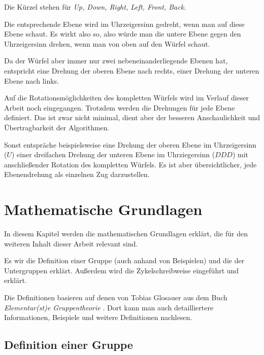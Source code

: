 \documentclass[12pt,a4paper, usenames, dvipsnames]{article}
\begin{document}
Die Kürzel stehen für \textit{Up, Down, Right, Left, Front, Back}.  


Die entsprechende Ebene wird im Uhrzeigersinn gedreht, wenn man auf diese Ebene schaut. Es wirkt also so, also würde man die untere Ebene gegen den Uhrzeigersinn drehen, wenn man von oben auf den Würfel schaut.  


Da der Würfel aber immer nur zwei nebeneinanderliegende Ebenen hat, entspricht eine Drehung der oberen Ebene nach rechts, einer Drehung der unteren Ebene nach links. 

Auf die Rotationsmöglichkeiten des kompletten Würfels wird im Verlauf dieser Arbeit noch eingegangen. Trotzdem werden die Drehungen für jede Ebene definiert. Das ist zwar nicht minimal, dient aber der besseren Anschaulichkeit und Übertragbarkeit der Algorithmen.

Sonst entspräche beispielsweise eine Drehung der oberen Ebene im Uhrzeigersinn ($U$) einer dreifachen Drehung der unteren Ebene im Uhrziegersinn ($DDD$) mit anschließender Rotation des kompletten Würfels. Es ist aber übersichtlicher, jede Ebenendrehung als einzelnen Zug darzustellen.


%
%
%
%
%
%
%
%
%
%
%
%
%
%
%
%
%


\newpage
\section{Mathematische Grundlagen}

In diesem Kapitel werden die mathematischen Grundlagen erklärt, die für den weiteren Inhalt dieser Arbeit relevant sind.

Es wir die Definition einer Gruppe (auch anhand von Beispielen) und die der Untergruppen erklärt. Außerdem wird die Zykelschreibweise eingeführt und erklärt.

Die Definitionen basieren auf denen von Tobias Glosauer aus dem Buch \textit{Elementar(st)e Gruppentheorie} \cite{Buch}. Dort kann man auch detailliertere Informationen, Beispiele und weitere Definitionen nachlesen.
%
%
%
%
%
%
\subsection*{Definition einer Gruppe} 
\end{document}
